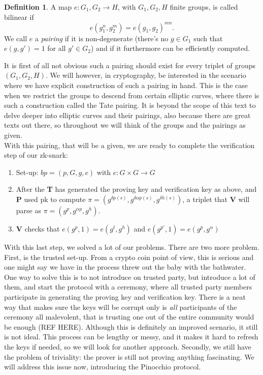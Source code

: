 \documentclass[11pt,oneside]{article}
\newcommand{\bP}{\textbf{P} }
\newcommand{\bV}{\textbf{V} }
\newcommand{\bT}{\textbf{T} }
\theoremstyle{definition}
\newtheorem{defn}[thm]{Definition}
\theoremstyle{remark}
\numberwithin{equation}{section}
\begin{document}
\begin{defn}\label{def:pairing}
A map $e:G_1,G_2\rightarrow H$, with $G_1,G_2,H$ finite groups, is called bilinear if 
$$e(g_1^n,g_2^m)=e(g_1,g_2)^{mn}.$$
We call $e$ a \emph{pairing} if it is non-degenerate (there's no $g\in G_1$ such that $e(g,g')=1$ for all $g'\in G_2$) and if it furthermore can be efficiently computed.
\end{defn}

It is first of all not obvious such a pairing should exist for every triplet of
groups $(G_1,G_2,H)$. We will however, in cryptography, be interested in the
scenario where we have explicit construction of such a pairing in hand. This is
the case when we restrict the groups to descend from certain elliptic curves,
where there is such a construction called the Tate pairing. It is beyond the
scope of this text to delve deeper into elliptic curves and their pairings, also
because there are great texts out there, so throughout we will think of the
groups and the pairings as given.\\ With this pairing, that will be a given, we
are ready to complete the verification step of our zk-snark:
\begin{enumerate}
	\item Set-up: $ bp=(p,G,g,e)$ with $e:G\times G\rightarrow G$
	\item After the \bT has generated the proving key and verification key as above, and \bP used pk to compute $\pi=(g^{\delta p(s)},g^{\delta\alpha p(s)},g^{\delta h(s) })$, a triplet that \bV will parse as $\pi=(g^p,g^{\alpha p},g^h)$.
	\item \bV checks that $e(g^p,1)=e(g^t,g^h)$ and $e(g^{p'},1)=e(g^p,g^\alpha)$
\end{enumerate}

With this last step, we solved a lot of our problems. There are two more
problem. First, is the trusted set-up. From a crypto coin point of view, this is
serious and one might say we have in the process threw out the baby with the
bathwater. One way to solve this is to not introduce on trusted party, but
introduce a lot of them, and start the protocol with a ceremony, where all
trusted party members participate in generating the proving key and verification
key. There is a neat way that makes sure the keys will be corrupt only is
\emph{all} participants of the ceremony all malevolent, that is trusting one out
of the entire community would be enough (REF HERE). Although this is definitely
an improved scenario, it still is not ideal. This process can be lengthy or
messy, and it makes it hard to refresh the keys if needed, so we will look for
another approach.  Secondly, we still have the problem of triviality: the prover
is still not proving anything fascinating.
We will address this issue now, introducing the Pinocchio protocol.
\end{document}
